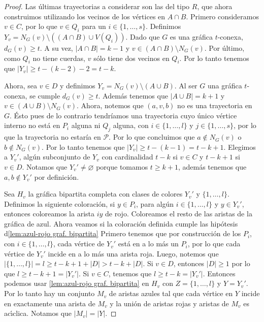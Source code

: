 \begin{proof}
    Las \'ultimas trayectorias a considerar son las del tipo $R$, que ahora
    construimos utilizando los vecinos de los v\'ertices en $A \cap B$. Primero
    consideramos $v \in C$, por lo que $v \in Q_i$ para un  $i \in \{1, \dots,
    s\}$. Definimos $Y_v = N_G(v) \setminus ((A \cap B) \cup V(Q_i))$. Dado que
    $G$ es una gr\'afica $t$-conexa, $d_G(v) \geq t$. A su vez, $|A \cap B| =k
    -1$ y $v \in (A \cap B) \setminus N_G(v)$. Por \'ultimo, como $Q_i$ no tiene
    cuerdas, $v$ s\'olo tiene dos vecinos en $Q_i$. Por lo tanto tenemos que
    $|Y_v| \geq t- (k-2)-2 = t-k$. 
    
    Ahora, sea $v \in D$ y definimos $Y_v = N_G(v) \setminus (A \cup B)$. Al ser
    $G$ una gr\'afica $t$-conexa, se cumple $d_G(v) \geq t$. Adem\'as tenemos
    que $|A \cup B| = k + 1$ y $v \in (A \cup B) \setminus N_G(v)$. Ahora,
    notemos que $(a, v, b)$ no es una trayectoria en $G$. \'Esto pues de lo
    contrario tendr\'i{}amos una trayectoria cuyo \'unico v\'ertice interno no
    est\'a en $P_i$ alguna ni $Q_j$ alguna, con $i \in \{1, \dots, l\}$ y $j \in
    \{1, \dots, s\}$, por lo que la trayectoria no estar\'i{}a en $\mathcal{P}$.
    Por lo que concluimos que $a \notin N_G(v)$ o $b \notin N_G(v)$. Por lo
    tanto tenemos que $|Y_v| \geq t- (k-1) = t-k + 1$. Elegimos a $Y_v '$,
    alg\'un subconjunto de $Y_v$ con cardinalidad $t-k$ si $v \in C$ y $t- k+ 1$
    si $v \in D$. Notamos que $Y_v ' \neq \varnothing$ porque tomamos $t \geq k
    + 1$, adem\'as tenemos que $a, b \notin Y_v '$ por definici\'on. 

    Sea $H_v$ la gr\'afica bipartita completa con clases de colores $Y_v '$ y
    $\{1,\dots, l\}$. Definimos la siguiente coloraci\'on, si $y \in P_i$, para
    alg\'un $i \in \{1, \dots, l\}$ y $y \in Y_v '$, entonces coloreamos la
    arista $iy$ de rojo. Coloreamos el resto de las aristas de la gr\'afica de
    azul. Ahora veamos si la coloraci\'on definida cumple las hip\'otesis
    d\cref{lem:azul-rojo graf. bipartita} Primero tenemos que por construcci\'on
    de los $P_i$, con $i \in \{1, \dots, l\}$, cada v\'ertice de $Y_v '$ est\'a
    en a lo m\'as un $P_i$, por lo que cada v\'ertice de $Y_v '$ incide en a lo
    m\'as una arista roja. Luego, notemos que $|\{1, \dots, l\}| = l  \geq t-k+
    1+ |D| > t-k + |D|$. Si $v \in D$, entonces $|D| \geq 1$ por lo que $l \geq
    t- k+1 = |Y_v '|$. Si $v \in C$, tenemos que $l \geq t-k = |Y_v '|$.
    Entonces podemos usar \cref{lem:azul-rojo graf. bipartita} en $H_v$ con $Z=
    \{1, \dots, l\}$ y $Y = Y_v '$. Por lo tanto hay un conjunto $M_v$ de
    aristas azules tal que cada v\'ertice en $Y$ incide en exactamente una
    arista de $M_v$ y la uni\'on de aristas rojas y aristas de $M_v$ es
    ac\'\i{}clica. Notamos que $|M_v|=|Y|$.


\end{proof}

